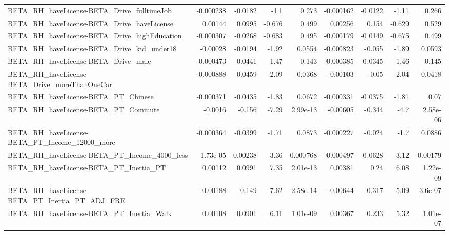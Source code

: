 \begin{tabular}{lrrrrrrrr}
BETA\_RH\_haveLicense-BETA\_Drive\_fulltimeJob         &   -0.000238 &      -0.0182 &     -1.1 &    0.273 &  -0.000162 &     -0.0122 &        -1.11 &         0.266 \\
BETA\_RH\_haveLicense-BETA\_Drive\_haveLicense         &     0.00144 &       0.0995 &   -0.676 &    0.499 &    0.00256 &       0.154 &       -0.629 &         0.529 \\
BETA\_RH\_haveLicense-BETA\_Drive\_highEducation       &   -0.000307 &      -0.0268 &   -0.683 &    0.495 &  -0.000179 &     -0.0149 &       -0.675 &         0.499 \\
BETA\_RH\_haveLicense-BETA\_Drive\_kid\_under18         &    -0.00028 &      -0.0194 &    -1.92 &   0.0554 &  -0.000823 &      -0.055 &        -1.89 &        0.0593 \\
BETA\_RH\_haveLicense-BETA\_Drive\_male                &   -0.000473 &      -0.0441 &    -1.47 &    0.143 &  -0.000385 &     -0.0345 &        -1.46 &         0.145 \\
BETA\_RH\_haveLicense-BETA\_Drive\_moreThanOneCar      &   -0.000888 &      -0.0459 &    -2.09 &   0.0368 &   -0.00103 &       -0.05 &        -2.04 &        0.0418 \\
BETA\_RH\_haveLicense-BETA\_PT\_Chinese                &   -0.000371 &      -0.0435 &    -1.83 &   0.0672 &  -0.000331 &     -0.0375 &        -1.81 &          0.07 \\
BETA\_RH\_haveLicense-BETA\_PT\_Commute                &     -0.0016 &       -0.156 &    -7.29 & 2.99e-13 &   -0.00605 &      -0.344 &         -4.7 &      2.58e-06 \\
BETA\_RH\_haveLicense-BETA\_PT\_Income\_12000\_more      &   -0.000364 &      -0.0399 &    -1.71 &   0.0873 &  -0.000227 &      -0.024 &         -1.7 &        0.0886 \\
BETA\_RH\_haveLicense-BETA\_PT\_Income\_4000\_less       &    1.73e-05 &      0.00238 &    -3.36 & 0.000768 &  -0.000497 &     -0.0628 &        -3.12 &       0.00179 \\
BETA\_RH\_haveLicense-BETA\_PT\_Inertia\_PT             &     0.00112 &       0.0991 &     7.35 & 2.01e-13 &    0.00381 &        0.24 &         6.08 &      1.22e-09 \\
BETA\_RH\_haveLicense-BETA\_PT\_Inertia\_PT\_ADJ\_FRE     &    -0.00188 &       -0.149 &    -7.62 & 2.58e-14 &   -0.00644 &      -0.317 &        -5.09 &       3.6e-07 \\
BETA\_RH\_haveLicense-BETA\_PT\_Inertia\_Walk           &     0.00108 &       0.0901 &     6.11 & 1.01e-09 &    0.00367 &       0.233 &         5.32 &      1.01e-07 \\

\end{tabular}
